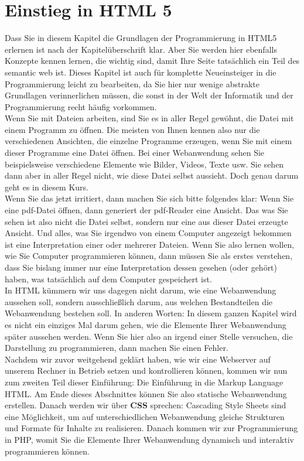 \chapter{Einstieg in HTML 5}

Dass Sie in diesem Kapitel die Grundlagen der Programmierung in HTML5 erlernen ist nach der Kapitelüberschrift klar. Aber Sie werden hier ebenfalls Konzepte kennen lernen, die wichtig sind, damit Ihre Seite tatsächlich ein Teil des semantic web ist. Dieses Kapitel ist auch für komplette Neueinsteiger in die Programmierung leicht zu bearbeiten, da Sie hier nur wenige abstrakte Grundlagen verinnerlichen müssen, die sonst in der Welt der Informatik und der Programmierung recht häufig vorkommen.\\

Wenn Sie mit Dateien arbeiten, sind Sie es in aller Regel gewöhnt, die Datei mit einem Programm zu öffnen. Die meisten von Ihnen kennen also nur die verschiedenen Ansichten, die einzelne Programme erzeugen, wenn Sie mit einem dieser Programme eine Datei öffnen. Bei einer Webanwendung sehen Sie beispielsweise verschiedene Elemente wie Bilder, Videos, Texte usw. Sie sehen dann aber in aller Regel nicht, wie diese Datei selbst aussieht. Doch genau darum geht es in diesem Kurs.\\

Wenn Sie das jetzt irritiert, dann machen Sie sich bitte folgendes klar: Wenn Sie eine pdf-Datei öffnen, dann generiert der pdf-Reader eine Ansicht. Das was Sie sehen ist also nicht die Datei selbst, sondern nur eine aus dieser Datei erzeugte Ansicht. Und alles, was Sie irgendwo von einem Computer angezeigt bekommen ist eine Interpretation einer oder mehrerer Dateien. Wenn Sie also lernen wollen, wie Sie Computer programmieren können, dann müssen Sie als erstes verstehen, dass Sie bislang immer nur eine Interpretation dessen gesehen (oder gehört) haben, was tatsächlich \glqq{}auf dem\grqq{} Computer gespeichert ist.\\

In HTML kümmern wir uns dagegen nicht darum, wie eine Webanwendung aussehen soll, sondern ausschließlich darum, aus welchen Bestandteilen die Webanwendung bestehen soll. In anderen Worten: In diesem ganzen Kapitel wird es nicht ein einziges Mal darum gehen, wie die Elemente Ihrer Webanwendung später aussehen werden. Wenn Sie hier also an irgend einer Stelle versuchen, die Darstellung zu programmieren, dann machen Sie einen Fehler.\\

Nachdem wir zuvor weitgehend geklärt haben, wie wir eine Webserver auf unserem Rechner in Betrieb setzen und kontrollieren können, kommen wir nun zum zweiten Teil dieser Einführung: Die Einführung in die Markup Language HTML. Am Ende dieses Abschnittes können Sie also statische Webanwendung erstellen. Danach werden wir über \textbf{CSS} sprechen: Cascading Style Sheets sind eine Möglichkeit, um auf unterschiedlichen Webanwendung gleiche Strukturen und Formate für Inhalte zu realisieren. Danach kommen wir zur Programmierung in PHP, womit Sie die Elemente Ihrer Webanwendung dynamisch und interaktiv programmieren können.\\

